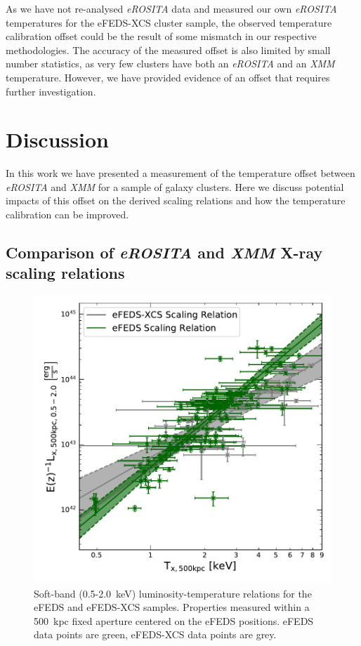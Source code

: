 \documentclass[fleqn,usenatbib]{mnras}
\begin{document}
As we have not re-analysed {\em eROSITA} data and measured our own {\em eROSITA} temperatures for the eFEDS-XCS cluster sample, the observed temperature calibration offset could be the result of some mismatch in our respective methodologies. The accuracy of the measured offset is also limited by small number statistics, as very few clusters have both an {\em eROSITA} and an {\em XMM} temperature. However, we have provided evidence of an offset that requires further investigation. 


\section{Discussion}
\label{sec:discussion}
In this work we have presented a measurement of the temperature offset between {\em eROSITA} and {\em XMM} for a sample of galaxy clusters.  Here we discuss potential impacts of this offset on the derived scaling relations and how the temperature calibration can be improved.  

\subsection{Comparison of {\em eROSITA} and {\em XMM} X-ray scaling relations}
\begin{figure}
    \centering
    \includegraphics[width=1\columnwidth]{images/efeds_xcs_wdata_lt.pdf}
    \caption[]{Soft-band (0.5-2.0~keV) luminosity-temperature relations for the eFEDS and eFEDS-XCS samples. Properties measured within a 500~kpc fixed aperture centered on the eFEDS positions. eFEDS data points are green, eFEDS-XCS data points are grey.}
    \label{fig:efedsandxcslt}
\end{figure}
\end{document}
